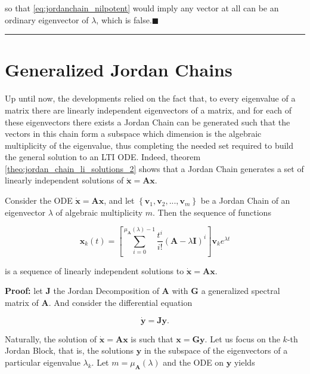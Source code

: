 	\noindent so that \eqref{eq:jordanchain_nilpotent} would imply any vector at all can be an ordinary eigenvector of $\lambda$, which is false.\hfill$\blacksquare$
\vspace{5mm}
\hrule
\vspace{5mm} %

\section{Generalized Jordan Chains} %

	Up until now, the developments relied on the fact that, to every eigenvalue of a matrix there are linearly independent eigenvectors of a matrix, and for each of these eigenvectors there exists a Jordan Chain can be generated such that the vectors in this chain form a subspace which dimension is the algebraic multiplicity of the eigenvalue, thus completing the needed set required to build the general solution to an LTI ODE. Indeed, theorem \ref{theo:jordan_chain_li_solutions_2} shows that a Jordan Chain generates a set of linearly independent solutions of $\dot{\mathbf{x}} = \mathbf{Ax}$.

\begin{theorem} \label{theo:jordan_chain_li_solutions_2} %
	Consider the ODE $\dot{\mathbf{x}} = \mathbf{Ax}$, and let $\left\{\mathbf{v}_1,\mathbf{v}_2,...,\mathbf{v}_m\right\}$ be a Jordan Chain of an eigenvector $\lambda$ of algebraic multiplicity $m$. Then the sequence of functions 

\begin{equation} \mathbf{x}_k(t) =  \left[\displaystyle\sum\limits_{i=0}^{\mu_\mathbf{A}\left(\lambda\right)-1} \dfrac{t^i}{i!}\left(\mathbf{A} - \lambda\mathbf{I}\right)^{i}\right] \mathbf{v}_ke^{\lambda t} \end{equation}

	\noindent is a sequence of linearly independent solutions to $\dot{\mathbf{x}} = \mathbf{Ax}$.
\end{theorem}
\textbf{Proof:} let $\mathbf{J}$ the Jordan Decomposition of $\mathbf{A}$ with $\mathbf{G}$ a generalized spectral matrix of $\mathbf{A}$. And consider the differential equation

\begin{equation}\dot{\mathbf{y}} = \mathbf{Jy}. \end{equation}

	Naturally, the solution of $\dot{\mathbf{x}} = \mathbf{Ax}$ is such that $\mathbf{x} = \mathbf{Gy}$. Let us focus on the $k$-th Jordan Block, that is, the solutions $\mathbf{y}$ in the subspace of the eigenvectors of a particular eigenvalue $\lambda_k$. Let $m = \mu_\mathbf{A}\left(\lambda\right)$ and the ODE on $\mathbf{y}$ yields

